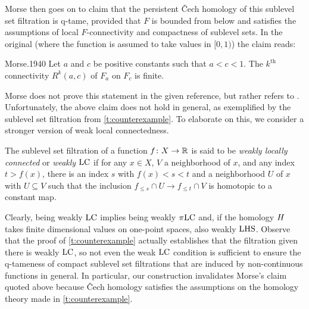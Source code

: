 Morse then goes on to claim that the persistent \v{C}ech homology of this sublevel set filtration is q-tame, provided that $F$ is bounded from below and satisfies the assumptions of local $F$-connectivity and compactness of sublevel sets.
In the original (where the function is assumed to take values in $[0,1)$) the claim reads:
\begin{displaycquote}[Theorem 6.3, p.~432]{Morse.1940}
	Let $a$ and $c$ be positive constants such that $a < c < 1$.
	The $k^{\mathrm{th}}$ connectivity $R^k(a,c)$ of $F_a$ on $F_c$ is finite.
\end{displaycquote}
Morse does not prove this statement in the given reference, but rather refers to \cite[Theorem~6.1]{Morse.1938}.
Unfortunately, the above claim does not hold in general, as exemplified by the sublevel set filtration from \cref{t:counterexample}.
To elaborate on this, we consider a stronger version of weak local connectedness.

\begin{defi}
	The sublevel set filtration of a function $f \colon X \to \mathbb{R}$ is said to be \emph{weakly locally connected} or \emph{weakly $\mathrm{LC}$} if for any $x \in X$, $V$ a neighborhood of $x$, and any index $t > f(x)$, there is an index $s$ with $f(x) < s < t$ and a neighborhood $U$ of $x$ with $U \subseteq V$ such that the inclusion $f_{\leq s} \cap U \to f_{\leq t} \cap V$ is homotopic to a constant map.
\end{defi}

Clearly, being weakly $\mathrm{LC}$ implies being weakly $\pi\mathrm{LC}$ and, if the homology $H$ takes finite dimensional values on one-point spaces, also weakly $\mathrm{LHS}$.
Observe that the proof of \cref{t:counterexample} actually establishes that the filtration given there is weakly $\mathrm{LC}$, so not even the weak $\mathrm{LC}$ condition is sufficient to ensure the q-tameness of compact sublevel set filtrations that are induced by non-continuous functions in general.
In particular, our construction invalidates Morse's claim quoted above because \v{C}ech homology satisfies the assumptions on the homology theory made in \cref{t:counterexample}.


